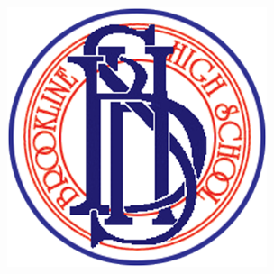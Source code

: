 \documentclass[11pt]{article}%
\begin{document}
\setlength{\baselineskip}{1.2\baselineskip}%
\begin{multicols*}{2}

\begin{center}\includegraphics[width=3in]{../images/BHSLogoNavyRed-400x400.png}\end{center}

\lipsum[1-2]


\divider
\hwnote{\lipsum[3]}

\end{multicols*}
\end{document}
